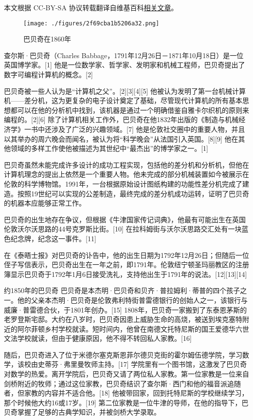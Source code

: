 
本文根据 CC-BY-SA 协议转载翻译自维基百科\href{https://en.wikipedia.org/wiki/Charles_Babbage}{相关文章}。

\begin{figure}[ht]
\centering
\texttt{[image: ./figures/2f69cba1b5206a32.png]}
\caption{巴贝奇在1860年} \label{fig_CRSBQ_1}
\end{figure}
查尔斯·巴贝奇（Charles Babbage，1791年12月26日－1871年10月18日）是一位英国博学家。[1] 他是一位数学家、哲学家、发明家和机械工程师，巴贝奇提出了数字可编程计算机的概念。[2]

巴贝奇被一些人认为是“计算机之父”。[2][3][4][5] 他被认为发明了第一台机械计算机——差分机，这为更复杂的电子设计奠定了基础，尽管现代计算机的所有基本思想都可以在他的分析机中找到，该机器是通过一个明确借鉴自雅卡尔织机的原则来编程的。[2][6] 除了计算机相关工作外，巴贝奇在他1832年出版的《制造与机械经济学》一书中还涉及了广泛的兴趣领域。[7] 他是伦敦社交圈中的重要人物，并且以其举办的周六晚会而闻名，被认为将“科学晚会”从法国引入英国。[8][9] 他在其他领域的多样工作使他被描述为其世纪中“最杰出”的博学家之一。[1]

巴贝奇虽然未能完成许多设计的成功工程实现，包括他的差分机和分析机，但他在计算机理念的提出上依然是一个重要人物。他未完成的部分机械装置如今被展示在伦敦的科学博物馆。1991年，一台根据原始设计图纸构建的功能性差分机完成了建造。按照19世纪可以实现的公差制造，最终完成的差分机成功运转，证明了巴贝奇的机器本应能够正常工作。


巴贝奇的出生地存在争议，但根据《牛津国家传记词典》，他最有可能出生在英国伦敦沃尔沃思路的44号克罗斯比街。[10] 在拉科姆街与沃尔沃思路交汇处有一块蓝色纪念牌，纪念这一事件。[11]

在《泰晤士报》对巴贝奇的讣告中，他的出生日期为1792年12月26日；但随后一位侄子写信表示，巴贝奇出生在一年之前，即1791年。伦敦纽宁顿圣玛丽教区的注册簿显示巴贝奇于1792年1月6日接受洗礼，支持他出生于1791年的说法。[12][13][14]

约1850年的巴贝奇
巴贝奇是本杰明·巴贝奇和贝齐·普拉姆利·蒂普的四个孩子之一。他的父亲本杰明·巴贝奇是伦敦弗利特街普雷德银行的创始人之一，该银行与威廉·普雷德合伙，于1801年创办。[15] 1808年，巴贝奇一家搬到了东泰恩茅斯的老罗登斯宅邸。大约在八岁时，巴贝奇因患上威胁生命的高烧，被送到埃克塞特附近的阿尔菲顿乡村学校就读。短时间内，他曾在南德文托特尼斯的国王爱德华六世文法学校就读，但由于健康原因，他不得不转回私人家教。[16]

随后，巴贝奇进入了位于米德尔塞克斯恩菲尔德贝克街的霍尔姆伍德学院，学习数学，该校由史蒂芬·弗里曼牧师主持。[17] 学院里有一个图书馆，这激发了巴贝奇对数学的热爱。离开学院后，巴贝奇又请了两位私人家教。第一位家教是一位来自剑桥附近的牧师；通过这位家教，巴贝奇结识了查尔斯·西门和他的福音派追随者，但家教的内容并不适合他。[18] 他被带回家，回到托特尼斯的学校继续学习，那个时候他大约16或17岁。[19] 第二位家教是一位牛津的导师，在他的指导下，巴贝奇掌握了足够的古典学知识，并被剑桥大学录取。